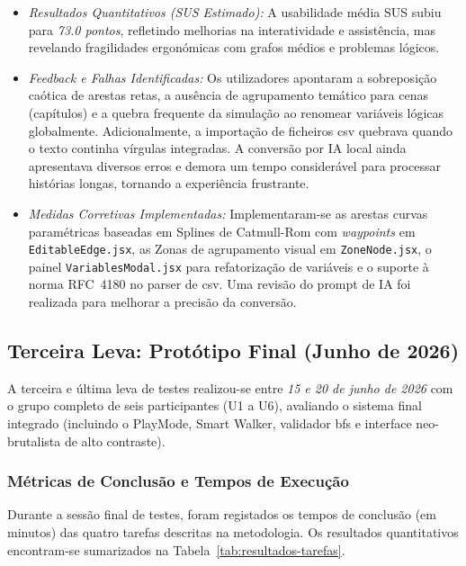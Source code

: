 \begin{itemize}
    \item \textit{Resultados Quantitativos (SUS Estimado):} A usabilidade média SUS subiu para \textit{73.0 pontos}, refletindo melhorias na interatividade e assistência, mas revelando fragilidades ergonómicas com grafos médios e problemas lógicos.
    \item \textit{Feedback e Falhas Identificadas:} Os utilizadores apontaram a sobreposição caótica de arestas retas, a ausência de agrupamento temático para cenas (capítulos) e a quebra frequente da simulação ao renomear variáveis lógicas globalmente. Adicionalmente, a importação de ficheiros \gls{csv} quebrava quando o texto continha vírgulas integradas. A conversão por IA local ainda apresentava diversos erros e demora um tempo considerável para processar histórias longas, tornando a experiência frustrante.
    \item \textit{Medidas Corretivas Implementadas:} Implementaram-se as arestas curvas paramétricas baseadas em Splines de Catmull-Rom com \textit{waypoints} em \texttt{EditableEdge.jsx}, as Zonas de agrupamento visual em \texttt{ZoneNode.jsx}, o painel \texttt{VariablesModal.jsx} para refatorização de variáveis e o suporte à norma RFC~4180 no parser de \gls{csv}. Uma revisão do prompt de IA foi realizada para melhorar a precisão da conversão.
\end{itemize}

\subsection{Terceira Leva: Protótipo Final (Junho de 2026)}
A terceira e última leva de testes realizou-se entre \textit{15 e 20 de junho de 2026} com o grupo completo de seis participantes (U1 a U6), avaliando o sistema final integrado (incluindo o PlayMode, Smart Walker, validador \gls{bfs} e interface neo-brutalista de alto contraste).

\subsubsection{Métricas de Conclusão e Tempos de Execução}
Durante a sessão final de testes, foram registados os tempos de conclusão (em minutos) das quatro tarefas descritas na metodologia. Os resultados quantitativos encontram-se sumarizados na Tabela~\ref{tab:resultados-tarefas}.


